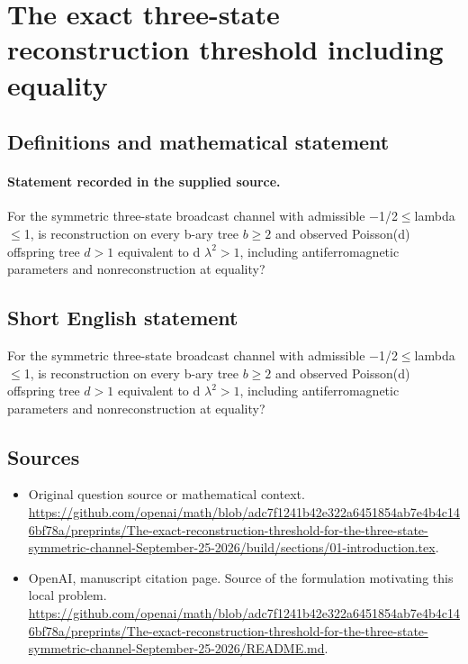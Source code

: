 \documentclass[11pt]{article}
\begin{document}
\section*{The exact three-state reconstruction threshold including equality}\label{30007403}
\subsection{Definitions and mathematical statement}
\paragraph{Statement recorded in the supplied source.}
For the symmetric three-state broadcast channel with admissible $-$1/2$\leq$lambda$\leq$1, is reconstruction on every b-ary tree $b\geq 2$ and observed Poisson(d) offspring tree $d>1$ equivalent to d $\lambda ^2>1$, including antiferromagnetic parameters and nonreconstruction at equality?
\subsection{Short English statement}
For the symmetric three-state broadcast channel with admissible $-$1/2$\leq$lambda$\leq$1, is reconstruction on every b-ary tree $b\geq 2$ and observed Poisson(d) offspring tree $d>1$ equivalent to d $\lambda ^2>1$, including antiferromagnetic parameters and nonreconstruction at equality?
\subsection{Sources}
\begin{itemize}
\item[S1] Original question source or mathematical context.
\url{https://github.com/openai/math/blob/adc7f1241b42e322a6451854ab7e4b4c146bf78a/preprints/The-exact-reconstruction-threshold-for-the-three-state-symmetric-channel-September-25-2026/build/sections/01-introduction.tex}.
\item[S2] OpenAI, manuscript citation page. Source of the formulation motivating this local problem.
\url{https://github.com/openai/math/blob/adc7f1241b42e322a6451854ab7e4b4c146bf78a/preprints/The-exact-reconstruction-threshold-for-the-three-state-symmetric-channel-September-25-2026/README.md}.
\end{itemize}
\end{document}
